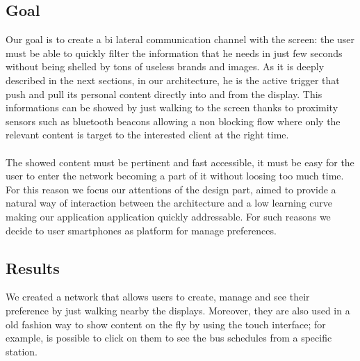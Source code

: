\documentclass[]{usiinfbachelorproject}
\begin{document}
\subsection{Goal}

Our goal is to create a bi lateral communication channel with the screen: the user must be able to quickly filter the information that he needs in just few seconds without being shelled by tons of useless brands and images. As it is deeply described in the next sections, in our architecture, he is the active trigger that push and pull its personal content directly into and from the display. This informations can be showed by just walking to the screen thanks to proximity sensors such as bluetooth beacons allowing a non blocking flow where only the relevant content is target to the interested client at the right time.
\\
\\
The showed content must be pertinent and fast accessible, it must be easy for the user to enter the network becoming a part of it without loosing too much time. For this reason we focus our attentions of the design part, aimed to provide a natural way of interaction between the architecture and a low learning curve making our application application quickly addressable. For such reasons we decide to user smartphones as platform for manage preferences.

\subsection{Results}
We created a network that allows users to create, manage and see their preference by just walking nearby the displays. Moreover, they are also used in a old fashion way to show content on the fly by using the touch interface; for example, is possible to click on them to see the bus schedules from a specific station.
\end{document}
